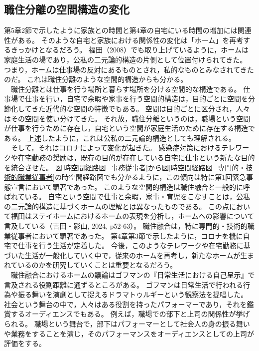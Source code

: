 \documentclass[paper={210mm,297mm},line_length=35zw,number_of_lines=31,head_space=30mm,gutter=40mm,baselineskip=2.0zw,headfoot_verticalposition=1.5zw]{jlreq} %
\begin{document}
\subsection{職住分離の空間構造の変化}

第5章2節で示したように家族との時間と第4章の自宅にいる時間の増加には関連性がある。
そのような自宅と家族における関係性の変化は「ホーム」を再考するきっかけとなるだろう。
福田（2008）でも取り上げているように，ホームは家庭生活の場であり，公私の二元論的構造の片側として位置付けられてきた。
つまり，ホームは仕事場の反対にあるものとされ，私的なものとみなされてきたのだ。
これは職住分離のような空間的構造からも分かる。\\
　職住分離とは仕事を行う場所と暮らす場所を分ける空間的な構造である。
仕事場で仕事を行い，自宅で余暇や家事を行う空間的構造は，目的ごとに空間を分節化してきた近代的な空間の特徴でもある。
空間は目的ごとに区分され，人々はその空間を使い分けてきた。
それ故，職住分離というのは，職場という空間が仕事を行うために存在し，自宅という空間が家庭生活のために存在する構造である。
上述したように，これは公私の二元論的構造としても理解される。\\
　そして，それはコロナによって変化が起きた。
感染症対策におけるテレワークや在宅勤務の奨励は，既存の目的が存在している自宅に仕事という新たな目的を統合させた。
図\ref{時空間経路図_事務従事者}から図\ref{時空間経路図_専門的・技術的職業従事者}の時空間経路図でも分かるように，この傾向は特に第1回緊急事態宣言において顕著であった。
このような空間的構造は職住融合と一般的に呼ばれている。
自宅という空間で仕事と余暇，家事・育児をこなすことは，公私の二元論的構造に基づくホームの理解とは異なったものである。
この点において福田はステイホームにおけるホームの表現を分析し，ホームへの影響について言及している（吉田・影山, 2024, p52-63）。
職住融合は，特に専門的・技術的職業従事者において顕著であった。
第4章第3節で示したように，コロナを機に自宅で仕事を行う生活が定着した。
今後，このようなテレワークや在宅勤務に基づいた生活が一般化していく中で，従来のホームを再考し，新たなホームが生まれているのかを研究していくことは重要となるだろう。\\
　職住融合におけるホームの議論はゴフマンの『日常生活における自己呈示』で言及される役割距離に通ずるところがある。
ゴフマンは日常生活で行われる行為や振る舞いを演劇として捉えるドラマトゥルギーという観察法を提唱した。
社会という舞台の中で，人々はある役割を持ったパフォーマーであり，それを鑑賞するオーディエンスでもある。
例えば，職場での部下と上司の関係性が挙げられる。
職場という舞台で，部下はパフォーマーとして社会人の身の振る舞いや業務をすることを演じ，そのパフォーマンスをオーディエンスとしての上司が評価をする。
\end{document}

